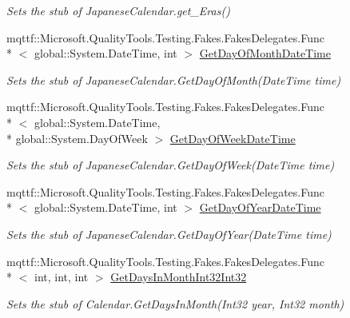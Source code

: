 \begin{DoxyCompactItemize}
\begin{DoxyCompactList}\small\item\em Sets the stub of Japanese\-Calendar.\-get\-\_\-\-Eras()\end{DoxyCompactList}\item 
mqttf\-::\-Microsoft.\-Quality\-Tools.\-Testing.\-Fakes.\-Fakes\-Delegates.\-Func\\*
$<$ global\-::\-System.\-Date\-Time, int $>$ \hyperlink{class_system_1_1_globalization_1_1_fakes_1_1_stub_japanese_calendar_aed1e4319a16e05f048a8e233beac7779}{Get\-Day\-Of\-Month\-Date\-Time}
\begin{DoxyCompactList}\small\item\em Sets the stub of Japanese\-Calendar.\-Get\-Day\-Of\-Month(\-Date\-Time time)\end{DoxyCompactList}\item 
mqttf\-::\-Microsoft.\-Quality\-Tools.\-Testing.\-Fakes.\-Fakes\-Delegates.\-Func\\*
$<$ global\-::\-System.\-Date\-Time, \\*
global\-::\-System.\-Day\-Of\-Week $>$ \hyperlink{class_system_1_1_globalization_1_1_fakes_1_1_stub_japanese_calendar_acc67f4bf56218861620e05952e223469}{Get\-Day\-Of\-Week\-Date\-Time}
\begin{DoxyCompactList}\small\item\em Sets the stub of Japanese\-Calendar.\-Get\-Day\-Of\-Week(\-Date\-Time time)\end{DoxyCompactList}\item 
mqttf\-::\-Microsoft.\-Quality\-Tools.\-Testing.\-Fakes.\-Fakes\-Delegates.\-Func\\*
$<$ global\-::\-System.\-Date\-Time, int $>$ \hyperlink{class_system_1_1_globalization_1_1_fakes_1_1_stub_japanese_calendar_a55b445417b890df6a1eba0dd795aa75a}{Get\-Day\-Of\-Year\-Date\-Time}
\begin{DoxyCompactList}\small\item\em Sets the stub of Japanese\-Calendar.\-Get\-Day\-Of\-Year(\-Date\-Time time)\end{DoxyCompactList}\item 
mqttf\-::\-Microsoft.\-Quality\-Tools.\-Testing.\-Fakes.\-Fakes\-Delegates.\-Func\\*
$<$ int, int, int $>$ \hyperlink{class_system_1_1_globalization_1_1_fakes_1_1_stub_japanese_calendar_a9f283dd7af2a417a77373193bb23ff4e}{Get\-Days\-In\-Month\-Int32\-Int32}
\begin{DoxyCompactList}\small\item\em Sets the stub of Calendar.\-Get\-Days\-In\-Month(\-Int32 year, Int32 month)\end{DoxyCompactList}\item 

\end{DoxyCompactItemize}
